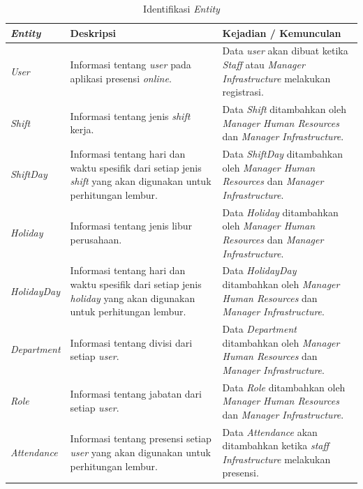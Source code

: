 \begin{longtable}{ |p{3cm}|p{6cm}|p{6cm}|}
\caption{Identifikasi \textit{Entity}}\label{tab:indentifikasi-entity} 
\\
\hline
\textbf{\textit{Entity}}
&\textbf{Deskripsi}
&\textbf{Kejadian / Kemunculan}
\\ 
\hline

\textit{User}
&Informasi tentang \textit{user} pada aplikasi presensi \textit{online}.
&Data \textit{user} akan dibuat ketika \textit{Staff} atau \textit{Manager Infrastructure} melakukan registrasi.
\\ 
\hline

\textit{Shift}
&Informasi tentang jenis \textit{shift} kerja.
&Data \textit{Shift} ditambahkan oleh \textit{Manager Human Resources} dan \textit{Manager Infrastructure}.
\\ 
\hline

\textit{ShiftDay}
&Informasi tentang hari dan waktu spesifik dari setiap jenis \textit{shift} yang akan digunakan untuk perhitungan lembur.
&Data \textit{ShiftDay} ditambahkan oleh \textit{Manager Human Resources} dan \textit{Manager Infrastructure}.
\\ 
\hline

\textit{Holiday}
&Informasi tentang jenis libur perusahaan.
&Data \textit{Holiday} ditambahkan oleh \textit{Manager Human Resources} dan \textit{Manager Infrastructure}.
\\ 
\hline

\textit{HolidayDay}
&Informasi tentang hari dan waktu spesifik dari setiap jenis \textit{holiday} yang akan digunakan untuk perhitungan lembur.
&Data \textit{HolidayDay} ditambahkan oleh \textit{Manager Human Resources} dan \textit{Manager Infrastructure}.
\\ 
\hline

\textit{Department}
&Informasi tentang divisi dari setiap \textit{user}.
&Data \textit{Department} ditambahkan oleh \textit{Manager Human Resources} dan \textit{Manager Infrastructure}.
\\ 
\hline

\textit{Role}
&Informasi tentang jabatan dari setiap \textit{user}.
&Data \textit{Role} ditambahkan oleh \textit{Manager Human Resources} dan \textit{Manager Infrastructure}.
\\ 
\hline

\textit{Attendance}
&Informasi tentang presensi setiap \textit{user} yang akan digunakan untuk perhitungan lembur.
&Data \textit{Attendance} akan ditambahkan ketika \textit{staff Infrastructure} melakukan presensi.
\\ 
\hline


\end{longtable}
